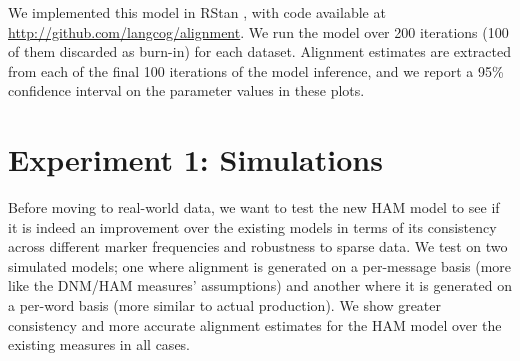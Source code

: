 \documentclass{acm_proc_article-sp}
\begin{document}
We implemented this model in RStan \cite{Stan}, with code available at \url{http://github.com/langcog/alignment}. We run the model over 200 iterations (100 of them discarded as burn-in) for each dataset.  Alignment estimates are extracted from each of the final 100 iterations of the model inference, and we report a 95\% confidence interval on the parameter values in these plots.



\section{Experiment 1: Simulations}
Before moving to real-world data, we want to test the new HAM model to see if it is indeed an improvement over the existing models in terms of its consistency across different marker frequencies and robustness to sparse data.  We test on two simulated models; one where alignment is generated on a per-message basis (more like the DNM/HAM measures' assumptions) and another where it is generated on a per-word basis (more similar to actual production).  We show greater consistency and more accurate alignment estimates for the HAM model over the existing measures in all cases.
\end{document}

